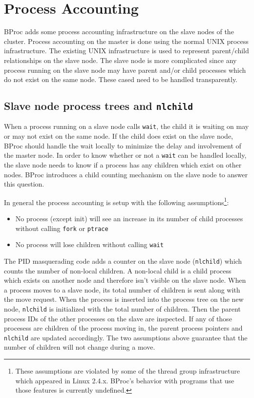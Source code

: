 \chapter{Process Accounting}

BProc adds some process accounting infrastructure on the slave nodes
of the cluster.  Process accounting on the master is done using the
normal UNIX process infrastructure.  The existing UNIX infrastructure
is used to represent parent/child relationships on the slave node.
The slave node is more complicated since any process running on the
slave node may have parent and/or child processes which do not exist
on the same node.  These cased need to be handled transparently.

\section{Slave node process trees and \texttt{nlchild}}
When a process running on a slave node calls \texttt{wait}, the child
it is waiting on may or may not exist on the same node.  If the child
does exist on the slave node, BProc should handle the wait locally to
minimize the delay and involvement of the master node.  In order to
know whether or not a \texttt{wait} can be handled locally, the slave
node needs to know if a process has any children which exist on other
nodes.  BProc introduces a child counting mechanism on the slave node
to answer this question.

In general the process accounting is setup with the following
assumptions\footnote{These assumptions are violated by some of the
thread group infrastructure which appeared in Linux 2.4.x.  BProc's
behavior with programs that use those features is currently
undefined.}:
\begin{itemize}
\item{No process (except init) will see an increase in its number of
child processes without calling \texttt{fork} or \texttt{ptrace}}
\item{No process will lose children without calling \texttt{wait}}\\
\end{itemize}

The PID masquerading code adds a counter on the slave node
(\texttt{nlchild}) which counts the number of non-local children.  A
non-local child is a child process which exists on another node and
therefore isn't visible on the slave node.  When a process moves to a
slave node, its total number of children is sent along with the move
request.  When the process is inserted into the process tree on the
new node, \texttt{nlchild} is initialized with the total number of
children.  Then the parent process IDs of the other processes on the
slave are inspected.  If any of those procesess are children of the
process moving in, the parent process pointers and \texttt{nlchild}
are updated accordingly.  The two assumptions above guarantee that the
number of children will not change during a move.

